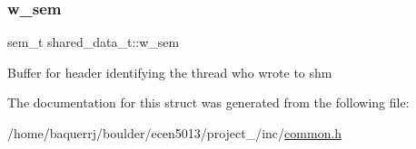 \subsubsection{\texorpdfstring{w\+\_\+sem}{w\_sem}}
{\footnotesize\ttfamily sem\+\_\+t shared\+\_\+data\+\_\+t\+::w\+\_\+sem}

Buffer for header identifying the thread who wrote to shm 

The documentation for this struct was generated from the following file\+:\begin{DoxyCompactItemize}
\item 
/home/baquerrj/boulder/ecen5013/project\+\_/inc/\hyperlink{common_8h}{common.\+h}\end{DoxyCompactItemize}
